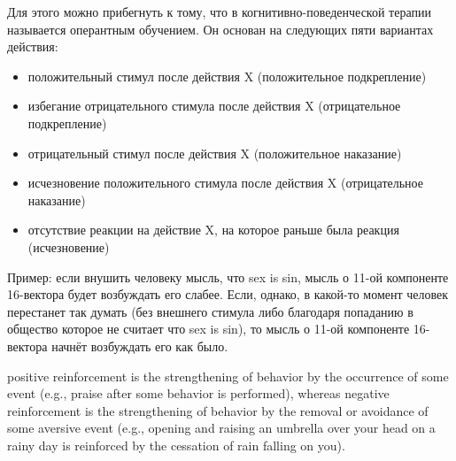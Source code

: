 \documentclass[11pt]{article}
\theoremstyle{remark}
\theoremstyle{definition}
\begin{document}
Для этого можно прибегнуть к тому, что в когнитивно-поведенческой терапии называется оперантным обучением. Он основан на следующих пяти вариантах действия:

\begin{itemize}
\item положительный стимул после действия X (положительное подкрепление)
\item избегание отрицательного стимула после действия X (отрицательное подкрепление)
\item отрицательный стимул после действия X (положительное наказание)
\item исчезновение положительного стимула после действия X (отрицательное наказание)
\item отсутствие реакции на действие X, на которое раньше была реакция (исчезновение)



\end{itemize}





Пример: если внушить человеку мысль, что sex is sin, мысль о 11-ой компоненте 16-вектора будет возбуждать его слабее. Если, однако, в какой-то момент человек перестанет так думать (без внешнего стимула либо благодаря попаданию в общество которое не считает что sex is sin), то мысль о 11-ой компоненте 16-вектора начнёт возбуждать его как было.



positive reinforcement is the strengthening of behavior by the occurrence of some event (e.g., praise after some behavior is performed), whereas negative reinforcement is the strengthening of behavior by the removal or avoidance of some aversive event (e.g., opening and raising an umbrella over your head on a rainy day is reinforced by the cessation of rain falling on you).




\end{document}
